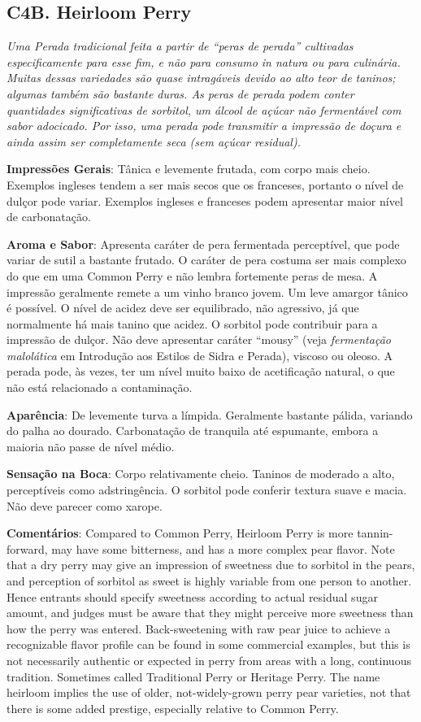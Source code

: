 \subsection*{C4B. Heirloom Perry}

\textit{Uma Perada tradicional feita a partir de “peras de perada” cultivadas especificamente para esse fim, e não para consumo in natura ou para culinária. Muitas dessas variedades são quase intragáveis devido ao alto teor de taninos; algumas também são bastante duras. As peras de perada podem conter quantidades significativas de sorbitol, um álcool de açúcar não fermentável com sabor adocicado. Por isso, uma perada pode transmitir a impressão de doçura e ainda assim ser completamente seca (sem açúcar residual).}

\textbf{Impressões Gerais}: Tânica e levemente frutada, com corpo mais cheio. Exemplos ingleses tendem a ser mais secos que os franceses, portanto o nível de dulçor pode variar. Exemplos ingleses e franceses podem apresentar maior nível de carbonatação.

\textbf{Aroma e Sabor}: Apresenta caráter de pera fermentada perceptível, que pode variar de sutil a bastante frutado. O caráter de pera costuma ser mais complexo do que em uma Common Perry e não lembra fortemente peras de mesa. A impressão geralmente remete a um vinho branco jovem. Um leve amargor tânico é possível. O nível de acidez deve ser equilibrado, não agressivo, já que normalmente há mais tanino que acidez. O sorbitol pode contribuir para a impressão de dulçor. Não deve apresentar caráter “mousy” (veja \textit{fermentação malolática} em Introdução aos Estilos de Sidra e Perada), viscoso ou oleoso. A perada pode, às vezes, ter um nível muito baixo de acetificação natural, o que não está relacionado a contaminação.

\textbf{Aparência}: De levemente turva a límpida. Geralmente bastante pálida, variando do palha ao dourado. Carbonatação de tranquila até espumante, embora a maioria não passe de nível médio.

\textbf{Sensação na Boca}: Corpo relativamente cheio. Taninos de moderado a alto, perceptíveis como adstringência. O sorbitol pode conferir textura suave e macia. Não deve parecer como xarope.

\textbf{Comentários}: Compared to Common Perry, Heirloom Perry is more tannin-forward, may have some bitterness, and has a more complex pear flavor. Note that a dry perry may give an impression of sweetness due to sorbitol in the pears, and perception of sorbitol as sweet is highly variable from one person to another. Hence entrants should specify sweetness according to actual residual sugar amount, and judges must be aware that they might perceive more sweetness than how the perry was entered. Back-sweetening with raw pear juice to achieve a recognizable flavor profile can be found in some commercial examples, but this is not necessarily authentic or expected in perry from areas with a long, continuous tradition. Sometimes called Traditional Perry or Heritage Perry. The name heirloom implies the use of older, not-widely-grown perry pear varieties, not that there is some added prestige, especially relative to Common Perry.

